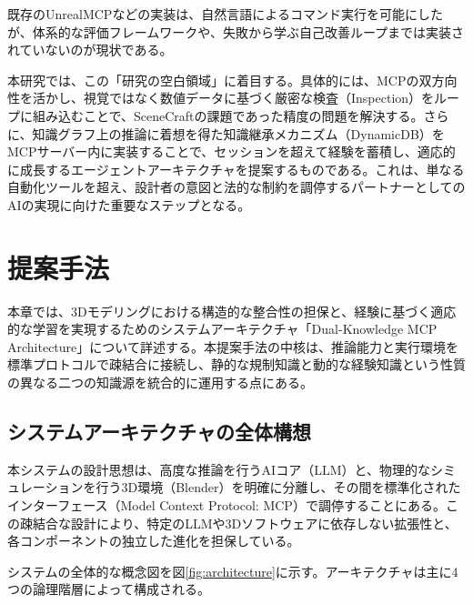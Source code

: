 \documentclass{deimj}
\begin{document}
既存のUnrealMCP\cite{unrealmcp2024}などの実装は、自然言語によるコマンド実行を可能にしたが、体系的な評価フレームワークや、失敗から学ぶ自己改善ループまでは実装されていないのが現状である。

本研究では、この「研究の空白領域」に着目する。具体的には、MCPの双方向性を活かし、視覚ではなく数値データに基づく厳密な検査（Inspection）をループに組み込むことで、SceneCraftの課題であった精度の問題を解決する。さらに、知識グラフ上の推論に着想を得た知識継承メカニズム（DynamicDB）をMCPサーバー内に実装することで、セッションを超えて経験を蓄積し、適応的に成長するエージェントアーキテクチャを提案するものである。これは、単なる自動化ツールを超え、設計者の意図と法的な制約を調停するパートナーとしてのAIの実現に向けた重要なステップとなる。

\section{提案手法}

本章では、3Dモデリングにおける構造的な整合性の担保と、経験に基づく適応的な学習を実現するためのシステムアーキテクチャ「Dual-Knowledge MCP Architecture」について詳述する。本提案手法の中核は、推論能力と実行環境を標準プロトコルで疎結合に接続し、静的な規制知識と動的な経験知識という性質の異なる二つの知識源を統合的に運用する点にある。

\subsection{システムアーキテクチャの全体構想}

本システムの設計思想は、高度な推論を行うAIコア（LLM）と、物理的なシミュレーションを行う3D環境（Blender\cite{community2018blender}）を明確に分離し、その間を標準化されたインターフェース（Model Context Protocol: MCP）で調停することにある。この疎結合な設計により、特定のLLMや3Dソフトウェアに依存しない拡張性と、各コンポーネントの独立した進化を担保している。

システムの全体的な概念図を図\ref{fig:architecture}に示す。アーキテクチャは主に4つの論理階層によって構成される。
\end{document}
